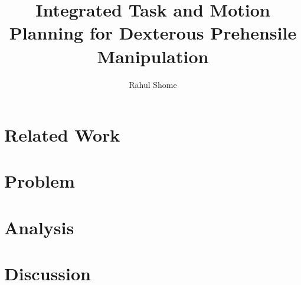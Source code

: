 \documentclass[letterpaper]{article} %
\begin{document}
\title{Integrated Task and Motion Planning for Dexterous Prehensile Manipulation}
\author{Rahul Shome}
\maketitle



\section{Related Work}


\section{Problem}


\section{Analysis}


\section{Discussion}


 


\end{document}
